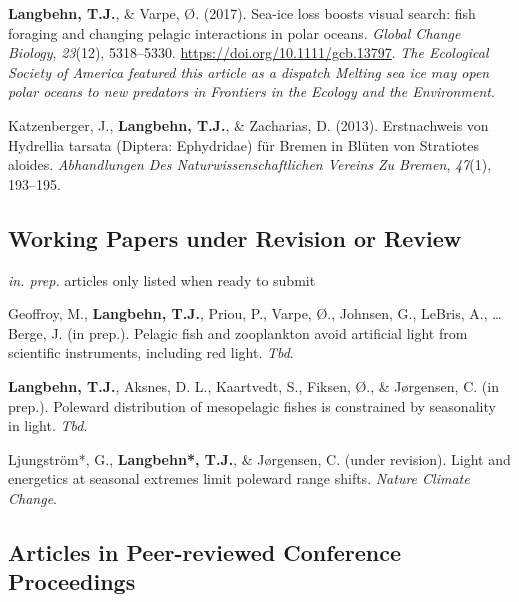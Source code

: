 \documentclass[11pt, a4paper]{awesome-cv}
\begin{document}
\leavevmode\hypertarget{ref-Langbehn2017}{}%
\textbf{Langbehn, T.J.}, \& Varpe, Ø. (2017). Sea-ice loss boosts visual
search: fish foraging and changing pelagic interactions in polar oceans.
\emph{Global Change Biology}, \emph{23}(12), 5318--5330.
\url{https://doi.org/10.1111/gcb.13797}. \emph{The Ecological Society of
America featured this article as a dispatch Melting sea ice may open
polar oceans to new predators in Frontiers in the Ecology and the
Environment}.

\leavevmode\hypertarget{ref-Katzenberger2013}{}%
Katzenberger, J., \textbf{Langbehn, T.J.}, \& Zacharias, D. (2013).
Erstnachweis von Hydrellia tarsata (Diptera: Ephydridae) für Bremen in
Blüten von Stratiotes aloides. \emph{Abhandlungen Des
Naturwissenschaftlichen Vereins Zu Bremen}, \emph{47}(1), 193--195.

\endgroup

\hypertarget{working-papers-under-revision-or-review}{%
\subsection{Working Papers under Revision or
Review}\label{working-papers-under-revision-or-review}}

\emph{in. prep.} articles only listed when ready to submit

\begingroup
\setlength{\parindent}{-0.5in}
\setlength{\leftskip}{0.5in}

\hypertarget{refs_working_paper}{}
\leavevmode\hypertarget{ref-Geoffroy}{}%
Geoffroy, M., \textbf{Langbehn, T.J.}, Priou, P., Varpe, Ø., Johnsen,
G., LeBris, A., \ldots{} Berge, J. (in prep.). Pelagic fish and
zooplankton avoid artificial light from scientific instruments,
including red light. \emph{Tbd}.

\leavevmode\hypertarget{ref-Langbehnh}{}%
\textbf{Langbehn, T.J.}, Aksnes, D. L., Kaartvedt, S., Fiksen, Ø., \&
Jørgensen, C. (in prep.). Poleward distribution of mesopelagic fishes is
constrained by seasonality in light. \emph{Tbd}.

\leavevmode\hypertarget{ref-Ljungstrom}{}%
Ljungström*, G., \textbf{Langbehn*, T.J.}, \& Jørgensen, C. (under
revision). Light and energetics at seasonal extremes limit poleward
range shifts. \emph{Nature Climate Change}.

\endgroup

\hypertarget{articles-in-peer-reviewed-conference-proceedings}{%
\subsection{Articles in Peer-reviewed Conference
Proceedings}\label{articles-in-peer-reviewed-conference-proceedings}}
\end{document}
